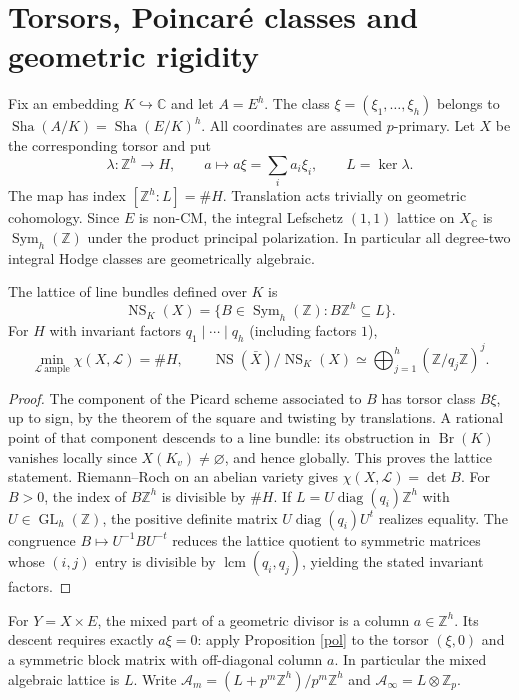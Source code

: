 \documentclass[11pt,a4paper]{article}
\theoremstyle{remark}\newtheorem{remark}[theorem]{Remark}
\newcommand{\Sha}{\mathop{\mathrm{Sha}}}\newcommand{\Pic}{\operatorname{Pic}}\newcommand{\Br}{\operatorname{Br}}\newcommand{\NS}{\operatorname{NS}}\newcommand{\Gal}{\operatorname{Gal}}\newcommand{\Hom}{\operatorname{Hom}}\newcommand{\Z}{\mathbb Z}\newcommand{\Q}{\mathbb Q}\newcommand{\F}{\mathbb F}\newcommand{\G}{\mathbb G}\newcommand{\coker}{\operatorname{coker}}\newcommand{\loc}{\operatorname{loc}}\newcommand{\et}{\mathrm{\acute et}}\newcommand{\Div}{\operatorname{Div}}\newcommand{\ord}{\operatorname{ord}}\newcommand{\im}{\operatorname{im}}\newcommand{\diag}{\operatorname{diag}}\newcommand{\rank}{\operatorname{rank}}\newcommand{\Sel}{\operatorname{Sel}}
\begin{document}
\section{Torsors, Poincar\'e classes and geometric rigidity}
Fix an embedding $K\hookrightarrow\mathbb C$ and let $A=E^h$. The class $\xi=(\xi_1,\dots,\xi_h)$ belongs to $\Sha(A/K)=\Sha(E/K)^h$. All coordinates are assumed $p$-primary. Let $X$ be the corresponding torsor and put
\[
 \lambda:\Z^h\longrightarrow H,\qquad a\longmapsto a\xi=\sum_i a_i\xi_i,\qquad L=\ker\lambda.
\]
The map has index $[\Z^h:L]=\#H$. Translation acts trivially on geometric cohomology. Since $E$ is non-CM, the integral Lefschetz $(1,1)$ lattice on $X_\mathbb C$ is $\operatorname{Sym}_h(\Z)$ under the product principal polarization. In particular all degree-two integral Hodge classes are geometrically algebraic.
\begin{proposition}\label{pol}
The lattice of line bundles defined over $K$ is
\[
 \NS_K(X)=\{B\in\operatorname{Sym}_h(\Z): B\Z^h\subseteq L\}.
\]
For $H$ with invariant factors $q_1\mid\cdots\mid q_h$ (including factors $1$),
\[
 \min_{\mathcal L\ \mathrm{ample}}\chi(X,\mathcal L)=\#H,\qquad
 \NS(\bar X)/\NS_K(X)\simeq\bigoplus_{j=1}^h(\Z/q_j\Z)^j.
\]
\end{proposition}
\begin{proof}
The component of the Picard scheme associated to $B$ has torsor class $B\xi$, up to sign, by the theorem of the square and twisting by translations. A rational point of that component descends to a line bundle: its obstruction in $\Br(K)$ vanishes locally since $X(K_v)\ne\varnothing$, and hence globally. This proves the lattice statement. Riemann--Roch on an abelian variety gives $\chi(X,\mathcal L)=\det B$. For $B>0$, the index of $B\Z^h$ is divisible by $\#H$. If $L=U\diag(q_i)\Z^h$ with $U\in\operatorname{GL}_h(\Z)$, the positive definite matrix $U\diag(q_i)U^t$ realizes equality. The congruence $B\mapsto U^{-1}BU^{-t}$ reduces the lattice quotient to symmetric matrices whose $(i,j)$ entry is divisible by $\operatorname{lcm}(q_i,q_j)$, yielding the stated invariant factors.
\end{proof}
For $Y=X\times E$, the mixed part of a geometric divisor is a column $a\in\Z^h$. Its descent requires exactly $a\xi=0$: apply Proposition \ref{pol} to the torsor $(\xi,0)$ and a symmetric block matrix with off-diagonal column $a$. In particular the mixed algebraic lattice is $L$. Write $\mathcal A_m=(L+p^m\Z^h)/p^m\Z^h$ and $\mathcal A_\infty=L\otimes\Z_p$.
\end{document}
